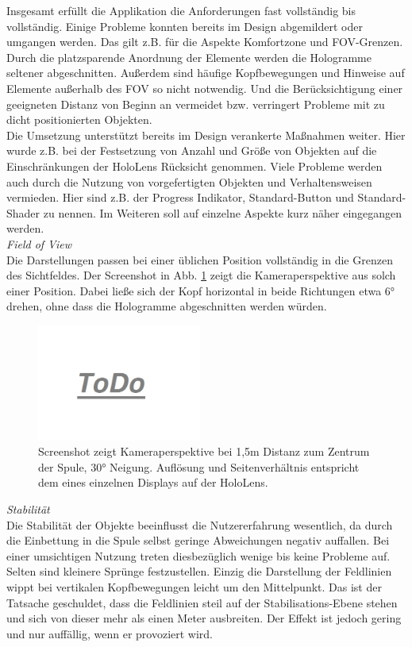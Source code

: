 Insgesamt erfüllt die Applikation die Anforderungen fast vollständig bis vollständig. Einige Probleme konnten bereits im Design abgemildert oder umgangen werden. Das gilt z.B. für die Aspekte Komfortzone und FOV-Grenzen. Durch die platzsparende Anordnung der Elemente werden die Hologramme seltener abgeschnitten. Außerdem sind häufige Kopfbewegungen und Hinweise auf Elemente außerhalb des FOV so nicht notwendig. Und die Berücksichtigung einer geeigneten Distanz von Beginn an vermeidet bzw. verringert Probleme mit zu dicht positionierten Objekten.\\

Die Umsetzung unterstützt bereits im Design verankerte Maßnahmen weiter. Hier wurde z.B. bei der Festsetzung von Anzahl und Größe von Objekten auf die Einschränkungen der HoloLens Rücksicht genommen. Viele Probleme werden auch durch die Nutzung von vorgefertigten Objekten und Verhaltensweisen vermieden. Hier sind z.B. der Progress Indikator, Standard-Button und Standard-Shader zu nennen. Im Weiteren soll auf einzelne Aspekte kurz näher eingegangen werden.\\

\textit{Field of View}\\
Die Darstellungen passen bei einer üblichen Position vollständig in die Grenzen des Sichtfeldes. Der Screenshot in Abb. \ref{img:fov} zeigt die Kameraperspektive aus solch einer Position. Dabei ließe sich der Kopf horizontal in beide Richtungen etwa 6° drehen, ohne dass die Hologramme abgeschnitten werden würden.
\begin{figure}
	\centering
	\includegraphics[width=0.48\textwidth]{images/todo.jpg}
	\caption{Screenshot zeigt Kameraperspektive bei 1,5m Distanz zum Zentrum der Spule, 30° Neigung. Auflösung und Seitenverhältnis entspricht dem eines einzelnen Displays auf der HoloLens.}
	\label{img:fov}
\end{figure}

\textit{Stabilität}\\
Die Stabilität der Objekte beeinflusst die Nutzererfahrung wesentlich, da durch die Einbettung in die Spule selbst geringe Abweichungen negativ auffallen. Bei einer umsichtigen Nutzung treten diesbezüglich wenige bis keine Probleme auf. Selten sind kleinere Sprünge festzustellen. Einzig die Darstellung der Feldlinien wippt bei vertikalen Kopfbewegungen leicht um den Mittelpunkt. Das ist der Tatsache geschuldet, dass die Feldlinien steil auf der Stabilisations-Ebene stehen und sich von dieser mehr als einen Meter ausbreiten. Der Effekt ist jedoch gering und nur auffällig, wenn er provoziert wird.\\

